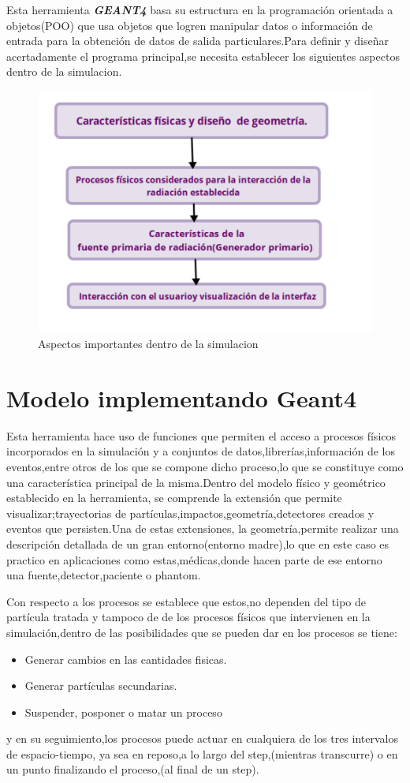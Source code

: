 \documentclass[12pt,fleqn]{book} %
\numberwithin{equation}{section} %
\numberwithin{figure}{section} %
\numberwithin{table}{section} %
\begin{document}
{ Esta herramienta \textbf{\textit{GEANT4}} basa su estructura en la programación orientada a objetos(POO) que usa objetos que logren manipular datos o información de entrada para la obtención de datos de salida particulares.Para definir y diseñar acertadamente el programa principal,se necesita establecer los siguientes aspectos dentro de la simulacion.
\begin{figure}[h]
    \centering
  \includegraphics[scale=0.7]{mm}
  \caption{Aspectos importantes dentro
de la simulacion}
  \label{fig:gatos}
\end{figure}



\section{Modelo implementando Geant4}
Esta herramienta hace uso de funciones que permiten el acceso a procesos físicos incorporados en la simulación y a conjuntos de datos,librerías,información de los eventos,entre otros de los que se compone dicho proceso,lo que se constituye como una característica principal de la misma.Dentro del modelo físico y geométrico establecido en la herramienta, se comprende la extensión que permite visualizar;trayectorias de partículas,impactos,geometría,detectores creados y eventos que persisten.Una de estas extensiones, la geometría,permite realizar una descripción detallada de un gran entorno(entorno madre),lo que en este caso es practico en aplicaciones como estas,médicas,donde hacen parte de ese entorno una fuente,detector,paciente o phantom.

Con respecto a los procesos se establece que estos,no dependen del tipo de partícula tratada y tampoco de de los procesos físicos que intervienen en la simulación,dentro de las posibilidades que se pueden dar en  los procesos se tiene:
\begin{itemize}
 \item Generar cambios en las cantidades fisicas.
 \item Generar partículas secundarias.
 \item Suspender, posponer o matar un proceso 
\end{itemize}
y en su seguimiento,los procesos puede actuar en cualquiera de los tres intervalos de espacio-tiempo, ya sea en reposo,a lo largo del step,(mientras transcurre) o en un punto finalizando el proceso,(al final de un step).

}
\end{document}
